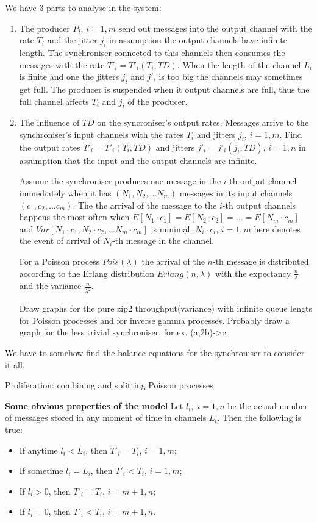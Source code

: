 We have 3 parts to analyse in the system:
\begin{enumerate}
\item The producer $P_{i}$, $i=1,m$ send out messages into the output channel with the rate $T_{i}$ and the jitter $j_{i}$ in assumption the output channels have infinite length. The synchroniser connected to this channels then consumes the messages with the rate $T'_{i} = T'_{i} (T_{i}, TD)$. When the length of the channel $L_{i}$ is finite and one the jitters $j_{i}$ and $j'_{i}$ is too big the channels may sometimes get full. The producer is suspended when it output channels are full, thus the full channel affects $T_{i}$ and $j_{i}$ of the producer.

\item The influence of $TD$ on the syncroniser's output rates. Messages arrive to the synchroniser's input channels with the rates $T_{i}$ and jitters $j_{i}$, $i=1,m$. Find the output rates $T'_{i} = T'_{i} (T_{i}, TD)$ and jitters $j'_{i} = j'_{i} (j_{i}, TD)$, $i=1,n$ in assumption that the input and the output channels are infinite.

Assume the synchroniser produces one message in the $i$-th output channel immediately when it has $(N_1, N_2, \dots N_m)$ messages in its input channels $(c_1, c_2, \dots c_m)$. The the arrival of the message to the $i$-th output channels happens the most often when $E[N_1 \cdot c_1] = E[N_2 \cdot c_2] = \dots = E[N_m \cdot c_m]$ and $Var[N_1 \cdot c_1, N_2 \cdot c_2, \dots N_m \cdot c_m]$ is minimal. $N_i \cdot c_i$, $i=1,m$ here denotes the event of arrival of $N_i$-th message in the channel.

For a Poisson process $Pois(\lambda)$ the arrival of the $n$-th message is distributed according to the Erlang distribution $Erlang(n, \lambda)$ with the expectancy $\frac{n}{\lambda}$ and the variance $\frac{n}{\lambda^2}$.

Draw graphs for the pure zip2 throughput(variance) with infinite queue lengts for Poisson processes and for inverse gamma processes. Probably draw a graph for the less trivial synchroniser, for ex. (a,2b)->c.

\end{enumerate}

We have to somehow find the balance equations for the synchroniser to consider it all.


Proliferation: combining and splitting Poisson processes


\textbf{Some obvious properties of the model}
Let $l_{i}, \; i = 1,n$ be the actual number of messages stored in any moment of time in channels $L_{i}$. Then the following is true:
  \begin{itemize}
  \item If anytime $l_{i} < L_{i}$, then $T'_{i} = T_{i}$, $i = 1,m$;
  \item If sometime $l_{i} = L_{i}$, then $T'_{i} < T_{i}$, $i = 1,m$;
  \item If $l_{i} > 0$, then $T'_{i} = T_{i}$, $i = m+1,n$;
  \item If $l_{i} = 0$, then $T'_{i} < T_{i}$, $i = m+1,n$.
  \end{itemize}


